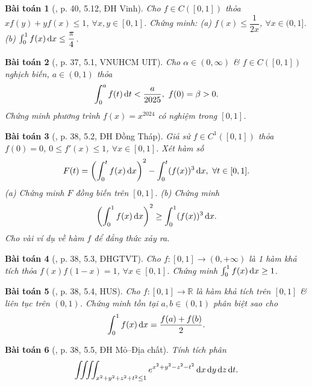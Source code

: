 \documentclass{article}
\newtheorem{baitoan}{Bài toán}
\begin{document}
\begin{baitoan}[\cite{VMS_VMC2023}, p. 40, 5.12, ĐH Vinh]
	Cho $f\in C([0,1])$ thỏa $xf(y) + yf(x)\le1$, $\forall x,y\in[0,1]$. Chứng minh: (a) $f(x)\le\dfrac{1}{2x}$, $\forall x\in(0,1]$. (b) $\int_0^1 f(x)\,{\rm d}x\le\dfrac{\pi}{4}$.
\end{baitoan}

\begin{baitoan}[\cite{VMS_VMC2024}, p. 37, 5.1, VNUHCM UIT]
	Cho $\alpha\in(0,\infty)$ \& $f\in C([0,1])$ nghịch biến, $a\in(0,1)$ thỏa
	\begin{equation*}
		\int_0^a f(t)\,{\rm d}t < \frac{a}{2025},\ f(0) = \beta > 0.
	\end{equation*}
	Chứng minh phương trình $f(x) = x^{2024}$ có nghiệm trong $[0,1]$.
\end{baitoan}

\begin{baitoan}[\cite{VMS_VMC2024}, p. 38, 5.2, ĐH Đồng Tháp]
	Giả sử $f\in C^1([0,1])$ thỏa $f(0) = 0$, $0\le f'(x)\le1$, $\forall x\in[0,1]$. Xét hàm số
	\begin{equation*}
		F(t) = \left(\int_0^t f(x)\,{\rm d}x\right)^2 - \int_0^t (f(x))^3\,{\rm d}x,\ \forall t\in[0,1].
	\end{equation*}
	(a) Chứng minh $F$ đồng biến trên $[0,1]$. (b) Chứng minh
	\begin{equation*}
		\left(\int_0^1 f(x)\,{\rm d}x\right)^2\ge\int_0^1 (f(x))^3\,{\rm d}x.
	\end{equation*}
	Cho vài ví dụ về hàm $f$ để đẳng thức xảy ra.
\end{baitoan}

\begin{baitoan}[\cite{VMS_VMC2024}, p. 38, 5.3, ĐHGTVT]
	Cho $f:[0,1]\to(0,+\infty)$ là 1 hàm khả tích thỏa $f(x)f(1 - x) = 1$, $\forall x\in[0,1]$. Chứng minh $\int_0^1 f(x)\,{\rm d}x\ge1$.
\end{baitoan}

\begin{baitoan}[\cite{VMS_VMC2024}, p. 38, 5.4, HUS]
	Cho $f:[0,1]\to\mathbb{R}$ là hàm khả tích trên $[0,1]$ \& liên tục trên $(0,1)$. Chứng minh tồn tại $a,b\in(0,1)$ phân biệt sao cho
	\begin{equation*}
		\int_0^1 f(x)\,{\rm d}x = \frac{f(a) + f(b)}{2}.
	\end{equation*}
\end{baitoan}

\begin{baitoan}[\cite{VMS_VMC2024}, p. 38, 5.5, ĐH Mỏ--Địa chất]
	Tính tích phân
	\begin{equation*}
		\iiiint_{x^2 + y^2 + z^2 + t^2\le1} e^{x^2 + y^2 - z^2 - t^2}\,{\rm d}x\,{\rm d}y\,{\rm d}z\,{\rm d}t.
	\end{equation*}
\end{baitoan}
\end{document}
